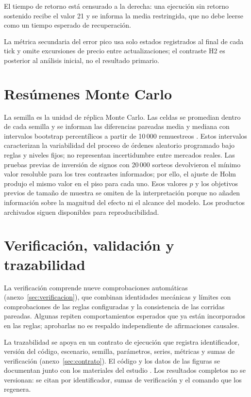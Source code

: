 El tiempo de retorno está censurado a la derecha: una ejecución sin retorno sostenido recibe el valor 21 y se informa la media restringida, que no debe leerse como un tiempo esperado de recuperación.

La métrica secundaria del error pico usa solo estados registrados al final de cada tick y omite excursiones de precio entre actualizaciones; el contraste H2 es posterior al análisis inicial, no el resultado primario.

\section{Resúmenes Monte Carlo}
\label{sec:analisis-estadistico}

La semilla es la unidad de réplica Monte Carlo. Las celdas se promedian dentro de cada semilla y se informan las diferencias pareadas media y mediana con intervalos bootstrap percentílicos a partir de 10\,000 remuestreos \cite{efron1979bootstrap}. Estos intervalos caracterizan la variabilidad del proceso de órdenes aleatorio programado bajo reglas y niveles fijos; no representan incertidumbre entre mercados reales. Las pruebas previas de inversión de signos con 20\,000 sorteos devolvieron el mínimo valor resoluble para los tres contrastes informados; por ello, el ajuste de Holm produjo el mismo valor en el piso para cada uno. Esos valores $p$ y los objetivos previos de tamaño de muestra se omiten de la interpretación porque no añaden información sobre la magnitud del efecto ni el alcance del modelo. Los productos archivados siguen disponibles para reproducibilidad.

\section{Verificación, validación y trazabilidad}

La verificación comprende nueve comprobaciones automáticas (anexo~\ref{sec:verificacion}), que combinan identidades mecánicas y límites con comprobaciones de las reglas configuradas y la consistencia de las corridas pareadas. Algunas repiten comportamientos esperados que ya están incorporados en las reglas; aprobarlas no es respaldo independiente de afirmaciones causales.

La trazabilidad se apoya en un contrato de ejecución que registra identificador, versión del código, escenario, semilla, parámetros, series, métricas y sumas de verificación (anexo~\ref{sec:contrato}). El código y los datos de las figuras se documentan junto con los materiales del estudio \cite{calderon2026repository}. Los resultados completos no se versionan: se citan por identificador, sumas de verificación y el comando que los regenera.

